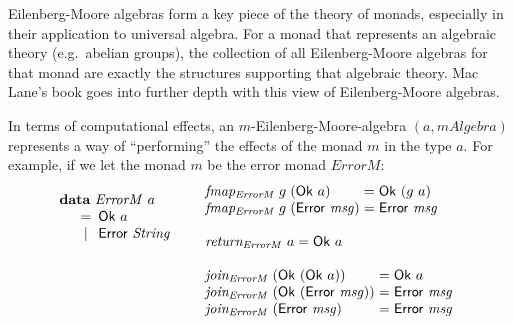 \documentclass{jfp1}
\newcommand{\kw}[1]{\textbf{#1}}
\begin{document}
Eilenberg-Moore algebras form a key piece of the theory of monads,
especially in their application to universal algebra. For a monad that
represents an algebraic theory (e.g.~abelian groups), the collection
of all Eilenberg-Moore algebras for that monad are exactly the
structures supporting that algebraic theory. Mac Lane's book
\cite{maclane98} goes into further depth with this view of
Eilenberg-Moore algebras.

In terms of computational effects, an $m$-Eilenberg-Moore-algebra $(a,
\mathit{mAlgebra})$ represents a way of ``performing'' the effects of
the monad $m$ in the type $a$. For example, if we let the monad $m$ be
the error monad $\mathit{ErrorM}$:
\begin{displaymath}
  \begin{array}{ll}
    \begin{array}[t]{l}
      \kw{data}~\mathit{ErrorM}~a \\
      \quad
      \begin{array}{c@{\hspace{0.5em}}l}
        = & \mathsf{Ok}~a \\
        | & \mathsf{Error}~\mathit{String}
      \end{array}
    \end{array}
    &
    \begin{array}[t]{l}
      \begin{array}{@{}l@{\hspace{0.3em}}l@{\hspace{0.3em}}l@{\hspace{0.3em}}c@{\hspace{0.3em}}l}
        \mathit{fmap_{ErrorM}}&g&(\mathsf{Ok}~a) &=& \mathsf{Ok}~(g~a) \\
        \mathit{fmap_{ErrorM}}&g&(\mathsf{Error}~\mathit{msg}) &=& \mathsf{Error}~\mathit{msg} \\
      \end{array} \\
      \\
      \mathit{return_{ErrorM}}~a = \mathsf{Ok}~a \\
      \\
      \begin{array}{@{}l@{\hspace{0.3em}}l@{\hspace{0.3em}}c@{\hspace{0.3em}}l}
        \mathit{join_{ErrorM}}&(\mathsf{Ok}~(\mathsf{Ok}~a)) &=& \mathsf{Ok}~a \\
        \mathit{join_{ErrorM}}&(\mathsf{Ok}~(\mathsf{Error}~\mathit{msg})) &=& \mathsf{Error}~\mathit{msg} \\
        \mathit{join_{ErrorM}}&(\mathsf{Error}~\mathit{msg}) &=& \mathsf{Error}~\mathit{msg}
      \end{array}
    \end{array}
  \end{array}
\end{displaymath}
\end{document}
